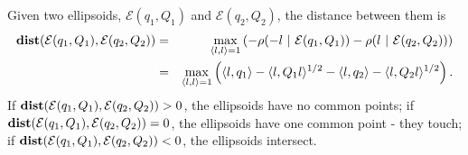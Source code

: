 \documentclass[letterpaper,10pt,english]{sphinxmanual}
\begin{document}
Given two ellipsoids, ${\mathcal E}(q_1,Q_1)$ and
${\mathcal E}(q_2,Q_2)$, the distance between them is
\label{chap_ellcalc:equation-dist_ell}\begin{gather}
\begin{split}\begin{aligned}
{\bf dist}({\mathcal E}(q_1,Q_1),{\mathcal E}(q_2,Q_2)) & = & \max_{\langle l,l\rangle=1}
\left(-\rho(-l ~|~ {\mathcal E}(q_1,Q_1)) - \rho(l ~|~ {\mathcal E}(q_2,Q_2))\right) \\
& = & \max_{\langle l,l\rangle=1}\left(\langle l,q_1\rangle -
\langle l,Q_1l\rangle^{1/2} - \langle l,q_2\rangle -
\langle l,Q_2l\rangle^{1/2}\right).
\end{aligned}\end{split}\label{chap_ellcalc-dist_ell}
\end{gather}
If ${\bf dist}({\mathcal E}(q_1,Q_1),{\mathcal E}(q_2,Q_2)) > 0$,
the ellipsoids have no common points; if
${\bf dist}({\mathcal E}(q_1,Q_1),{\mathcal E}(q_2,Q_2)) = 0$, the
ellipsoids have one common point - they touch; if
${\bf dist}({\mathcal E}(q_1,Q_1),{\mathcal E}(q_2,Q_2)) < 0$, the
ellipsoids intersect.
\end{document}
